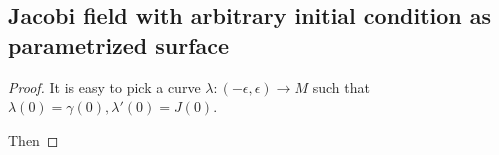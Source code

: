 
{

\subsection{Jacobi field with arbitrary initial condition as parametrized surface}

\renewcommand*{\d}{\mathrm{d}\,} %
\newcommand*{\D}{\mathrm{D}\,} %


\begin{proof}
It is easy to pick a curve $\lambda:(-\epsilon, \epsilon) \rightarrow M$ such that $\lambda(0)=\gamma(0), \lambda'(0)=J(0)$.
\par
Then 

\end{proof}

}
